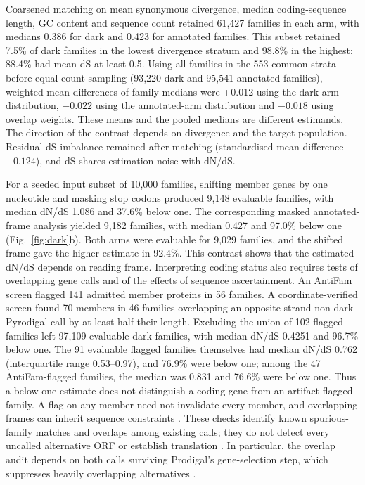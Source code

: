 \documentclass[11pt]{article}
\begin{document}
Coarsened matching on mean synonymous divergence, median coding-sequence length, GC content
and sequence count retained 61{,}427 families in each arm, with medians 0.386 for dark and 0.423 for annotated families.
This subset retained 7.5\% of dark families in the lowest divergence stratum and 98.8\% in
the highest; 88.4\% had mean dS at least 0.5. Using all families in the 553 common strata before equal-count sampling
(93{,}220 dark and 95{,}541 annotated families), weighted mean differences of family medians were +0.012 using the dark-arm distribution,
$-0.022$ using the annotated-arm distribution and $-0.018$ using overlap weights.
These means and the pooled medians are different estimands. The direction of the contrast
depends on divergence and the target population. Residual dS imbalance remained after matching
(standardised mean difference $-0.124$), and dS shares estimation noise with dN/dS.

For a seeded input subset of 10{,}000 families, shifting member genes by one nucleotide and
masking stop codons produced 9{,}148 evaluable families, with median dN/dS 1.086 and 37.6\%
below one. The corresponding masked annotated-frame analysis yielded 9{,}182 families, with
median 0.427 and 97.0\% below one (Fig.~\ref{fig:dark}b). Both arms were evaluable for 9{,}029 families, and the shifted
frame gave the higher estimate in 92.4\%. This contrast shows that the estimated dN/dS
depends on reading frame. Interpreting coding status also requires tests of overlapping gene
calls and of the effects of sequence ascertainment.
An AntiFam screen flagged 141 admitted member proteins in 56 families. A coordinate-verified
screen found 70 members in 46 families overlapping an opposite-strand non-dark Pyrodigal call
by at least half their length. Excluding the union of 102 flagged families left 97{,}109
evaluable dark families, with median dN/dS 0.4251 and 96.7\% below one. The 91 evaluable flagged families themselves had median dN/dS 0.762 (interquartile range 0.53--0.97), and 76.9\% were below one; among the 47 AntiFam-flagged families, the median was 0.831 and 76.6\% were below one. Thus a below-one estimate does not distinguish a coding gene from an artifact-flagged family. A flag on any member need not invalidate every member, and overlapping frames can inherit sequence constraints \citep{nelson2020olgenie,yooseph2007gos}. These checks identify
known spurious-family matches and overlaps among existing calls; they do not detect every
uncalled alternative ORF or establish translation \citep{eberhardt2012antifam}. In particular, the overlap audit depends on both calls surviving Prodigal's gene-selection step, which suppresses heavily overlapping alternatives \citep{hyatt2010prodigal}.
\end{document}
